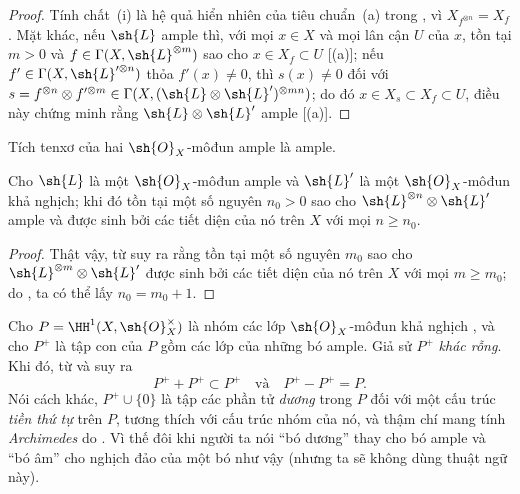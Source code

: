 \documentclass[oneside,10pt]{amsart}
\renewcommand{\geq}{\geqslant}
\let\EGAOriginalLabel\label
\renewcommand{\label}[1]{\phantomsection\EGAOriginalLabel{#1}}
\begin{document}
\begin{proof}
Tính chất~(i) là hệ quả hiển nhiên của tiêu chuẩn~(a) trong , vì $X_{f^{\otimes n}}=X_f$.
Mặt khác, nếu $\sh{L}$ ample thì, với mọi $x\in X$ và mọi lân cận $U$ của $x$, tồn tại $m>0$ và $f\in\Gamma(X,\sh{L}^{\otimes m})$ sao cho $x\in X_f\subset U$ [(a)];
nếu $f'\in\Gamma(X,\sh{L}'^{\otimes n})$ thỏa $f'(x)\neq0$, thì $s(x)\neq0$ đối với $s=f^{\otimes n}\otimes f'^{\otimes m}\in\Gamma(X,(\sh{L}\otimes\sh{L}')^{\otimes mn})$; do đó $x\in X_s\subset X_f\subset U$, điều này chứng minh rằng $\sh{L}\otimes\sh{L}'$ ample [(a)].
\end{proof}

\begin{corollary}[4.5.7]
\label{II.4.5.7}
Tích tenxơ của hai $\sh{O}_X$-môđun ample là ample.
\end{corollary}

\begin{corollary}[4.5.8]
\label{II.4.5.8}
Cho $\sh{L}$ là một $\sh{O}_X$-môđun ample và $\sh{L}'$ là một $\sh{O}_X$-môđun khả nghịch;
khi đó tồn tại một số nguyên $n_0>0$ sao cho $\sh{L}^{\otimes n}\otimes\sh{L}'$ ample và được sinh bởi các tiết diện của nó trên $X$ với mọi $n\geq n_0$.
\end{corollary}

\begin{proof}
Thật vậy, từ  suy ra rằng tồn tại một số nguyên $m_0$ sao cho $\sh{L}^{\otimes m}\otimes\sh{L}'$ được sinh bởi các tiết diện của nó trên $X$ với mọi $m\geq m_0$;
do , ta có thể lấy $n_0=m_0+1$.
\end{proof}

\begin{remark}[4.5.9]
\label{II.4.5.9}
Cho $P=\HH^1(X,\sh{O}_X^\times)$ là nhóm các lớp $\sh{O}_X$-môđun khả nghịch , và cho $P^+$ là tập con của $P$ gồm các lớp của những bó ample.
Giả sử $P^+$ \emph{khác rỗng}.
Khi đó, từ  và  suy ra
\[
  P^+ + P^+ \subset P^+
  \quad\text{và}\quad
  P^+ - P^+ = P.
\]
Nói cách khác, $P^+\cup\{0\}$ là tập các phần tử \emph{dương} trong $P$ đối với một cấu trúc \emph{tiền thứ tự} trên $P$, tương thích với cấu trúc nhóm của nó, và thậm chí mang tính \emph{Archimedes} do .
Vì thế đôi khi người ta nói ``bó dương'' thay cho bó ample và ``bó âm'' cho nghịch đảo của một bó như vậy (nhưng ta sẽ không dùng thuật ngữ này).
\end{remark}
\end{document}
